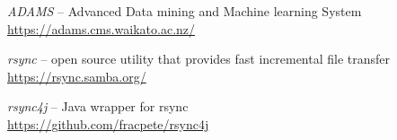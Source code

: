 %

\begin{thebibliography}{999}

		\textit{ADAMS} -- Advanced Data mining and Machine learning System \\
		\url{https://adams.cms.waikato.ac.nz/}{}
		
		\textit{rsync} -- open source utility that provides fast incremental 
                file transfer \\
		\url{https://rsync.samba.org/}{}

		\textit{rsync4j} -- Java wrapper for rsync \\
		\url{https://github.com/fracpete/rsync4j}{}

\end{thebibliography}
